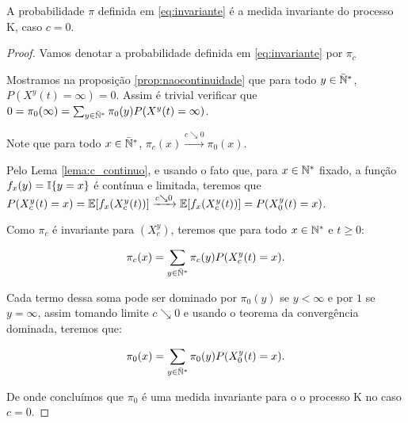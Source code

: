 \begin{proposicao}
  A probabilidade $\pi$ definida em \eqref{eq:invariante} é a medida
  invariante do processo K, caso $c = 0$.
\end{proposicao}
\begin{proof}

  Vamos denotar a probabilidade definida em \eqref{eq:invariante} por
  $\pi_c$

  Mostramos na proposição \ref{prop:naocontinuidade} que para todo $y
  \in {\mathbb{\bar{N}^*}}$, $P(X^y(t) = \infty) = 0$. Assim é trivial verificar que
  $0 = \pi_0(\infty) = \sum_{y\in{\mathbb{\bar{N}^*}}} \pi_0(y) P(X^y(t) =
  \infty)$.

  Note que para todo $x \in {\mathbb{\bar{N}^*}}$, $\pi_c(x) \xrightarrow{c\searrow0}
  \pi_0(x)$.

  Pelo Lema \ref{lema:c_continuo}, e usando o fato que, para $x \in
  {\mathbb{N^*}}$ fixado, a função $f_x(y) = {\mathbb{I}}\{y = x\}$ é contínua e
  limitada, teremos que $P(X^y_c (t) = x) = {\mathbb{E}} [f_x(X^y_c(t))]
  \xrightarrow{c\searrow0} {\mathbb{E}} [f_x(X^y_c(t))] = P(X^y_0(t) = x)$.

  Como $\pi_c$ é invariante para $(X^y_c)$, teremos que para todo $x
  \in {\mathbb{N^*}}$ e $t \geq 0$:

  \begin{align*}
    \pi_c(x) &= \sum_{y \in {\mathbb{\bar{N}^*}}} \pi_c (y) P(X^y_c (t) = x).\\
  \end{align*}

  Cada termo dessa soma pode ser dominado por $\pi_0(y)$ se $y <
  \infty$ e por $1$ se $y = \infty$, assim tomando limite $c\searrow0$
  e usando o teorema da convergência dominada, teremos que:

  \begin{align*}
    \pi_0(x) &= \sum_{y \in {\mathbb{\bar{N}^*}}} \pi_0 (y) P(X^y_0 (t) = x).\\
  \end{align*}

  De onde concluímos que $\pi_0$ é uma medida invariante para o o
  processo K no caso $c = 0$.
\end{proof}


